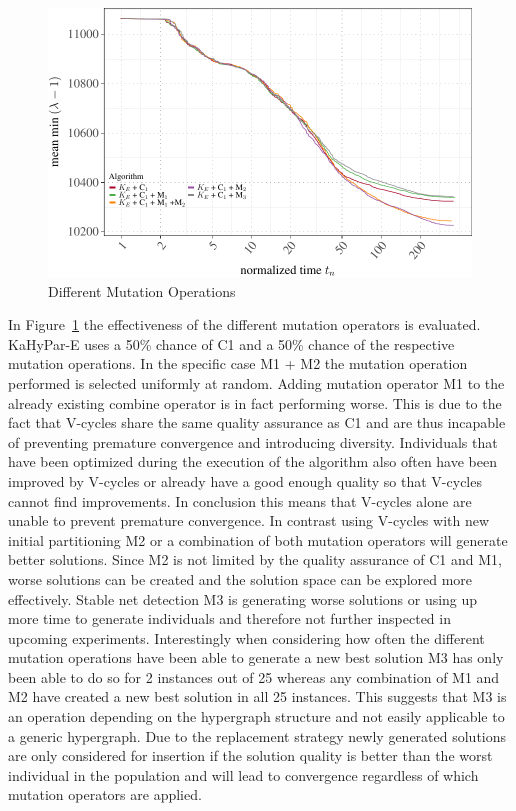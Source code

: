 \documentclass[a4paper,12pt,titlepage, BCOR7mm,headsepline]{scrbook}
\numberwithin{equation}{section}
\begin{document}
\begin{figure}[H]

\begin{center}
\includegraphics{rnw/tuning_subset_plots/mutation_plot-1}\caption{Different Mutation Operations}\label{fig:mutateoperatorevaluation}
\end{center}

\end{figure}
In Figure~\ref{fig:mutateoperatorevaluation} the effectiveness of the different mutation operators is evaluated. KaHyPar-E uses a 50\% chance of C1 and a 50\% chance of the respective mutation operations. In the specific case M1 + M2 the mutation operation performed is selected uniformly at random. Adding mutation operator M1 to the already existing combine operator is in fact performing worse. This is due to the fact that V-cycles share the same quality assurance as C1 and are thus incapable of preventing premature convergence and introducing diversity. Individuals that have been optimized during the execution of the algorithm also often have been improved by V-cycles or already have a good enough quality so that V-cycles cannot find improvements. In conclusion this means that V-cycles alone are unable to prevent premature convergence. In contrast using V-cycles with new initial partitioning M2 or a combination of both mutation operators will generate better solutions. Since M2 is not limited by the quality assurance of C1 and M1, worse solutions can be created and the solution space can be explored more effectively. Stable net detection M3 is generating worse solutions or using up more time to generate individuals and therefore not further inspected in upcoming experiments. Interestingly when considering how often the different mutation operations have been able to generate a new best solution M3 has only been able to do so for 2 instances out of 25 whereas any combination of M1 and M2 have created a new best solution in all 25 instances. This suggests that M3 is an operation depending on the hypergraph structure and not easily applicable to a generic hypergraph. Due to the replacement strategy newly generated solutions are only considered for insertion if the solution quality is better than the worst individual in the population and will lead to convergence regardless of which mutation operators are applied. 
\end{document}
